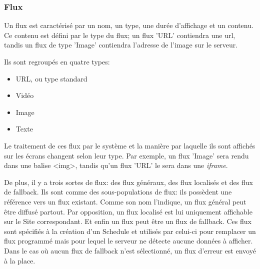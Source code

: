 \documentclass[french]{article}
\begin{document}
\subsubsection{Flux}

Un flux est caractérisé par un nom, un type, une durée d'affichage et un contenu. Ce contenu est défini par le type du flux; un flux 'URL' contiendra une url, tandis un flux de type 'Image' contiendra l'adresse de l'image sur le serveur.

Ils sont regroupés en quatre types:
\begin{itemize}
	\item URL, ou type standard
	\item Vidéo
	\item Image
	\item Texte
\end{itemize}
Le traitement de ces flux par le système et la manière par laquelle ils sont affichés sur les écrans changent selon leur type. Par exemple, un flux 'Image' sera rendu dans une balise <img>, tandis qu'un flux 'URL' le sera dans une \textit{iframe}.

De plus, il y a trois sortes de flux: des flux généraux, des flux localisés et des flux de fallback. Ils sont comme des sous-populations de flux: ils possèdent une référence vers un flux existant. \newline
Comme son nom l'indique, un flux général peut être diffusé partout. Par opposition, un flux localisé est lui uniquement affichable sur le Site correspondant.
Et enfin un flux peut être un flux de fallback. Ces flux sont spécifiés à la création d'un Schedule et utilisés par celui-ci pour remplacer un flux programmé mais pour lequel le serveur ne détecte aucune données à afficher. Dans le cas où aucun flux de fallback n'est sélectionné, un flux d'erreur est envoyé à la place. \newline 
\end{document}
